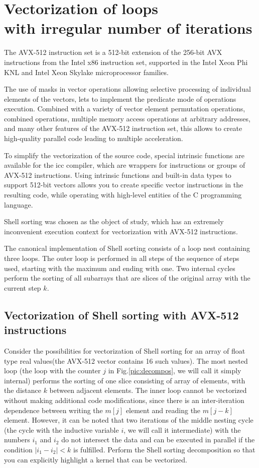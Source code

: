 \documentclass[
11pt,%
tightenlines,%
twoside,%
onecolumn,%
nofloats,%
nobibnotes,%
nofootinbib,%
superscriptaddress,%
noshowpacs,%
centertags]%
{revtex4}
\begin{document}
\section{Vectorization of loops \protect\\
with irregular number of iterations}

The AVX-512 instruction set is a 512-bit extension of the 256-bit AVX instructions from the Intel x86 instruction set, supported in the Intel Xeon Phi KNL and Intel Xeon Skylake microprocessor families.

The use of masks in vector operations allowing selective processing of individual elements of the vectors, lets to implement the predicate mode of operations execution.
Combined with a variety of vector element permutation operations, combined operations, multiple memory access operations at arbitrary addresses, and many other features of the AVX-512 instruction set, this allows to create high-quality parallel code leading to multiple acceleration.

To simplify the vectorization of the source code, special intrinsic functions are available for the icc compiler, which are wrappers for instructions or groups of AVX-512 instructions.
Using intrinsic functions and built-in data types to support 512-bit vectors allows you to create specific vector instructions in the resulting code, while operating with high-level entities of the C programming language.

Shell sorting was chosen as the object of study, which has an extremely inconvenient execution context for vectorization with AVX-512 instructions.

The canonical implementation of Shell sorting consists of a loop nest containing three loops.
The outer loop is performed in all steps of the sequence of steps used, starting with the maximum and ending with one.
Two internal cycles perform the sorting of all subarrays that are slices of the original array with the current step $ k $.

\subsection*{Vectorization of Shell sorting with AVX-512 instructions}

Consider the possibilities for vectorization of Shell sorting for an array of float type real values(the AVX-512 vector contains 16 such values).
The most nested loop (the loop with the counter $ j $ in Fig.\ref{pic:decompos}, we will call it simply internal) performs the sorting of one slice consisting of array of elements, with the distance $ k $ between adjacent elements.
The inner loop cannot be vectorized without making additional code modifications, since there is an inter-iteration dependence between writing the $ m [j] $ element and reading the $ m [j - k] $ element. However, it can be noted that two iterations of the middle nesting cycle (the cycle with the inductive variable $ i $, we will call it intermediate) with the numbers $ i_1 $ and $ i_2 $ do not intersect the data and can be executed in parallel if the condition $ | i_1 - i_2 | < k $ is fulfilled. Perform the Shell sorting decomposition so that you can explicitly highlight a kernel that can be vectorized.
\end{document}
